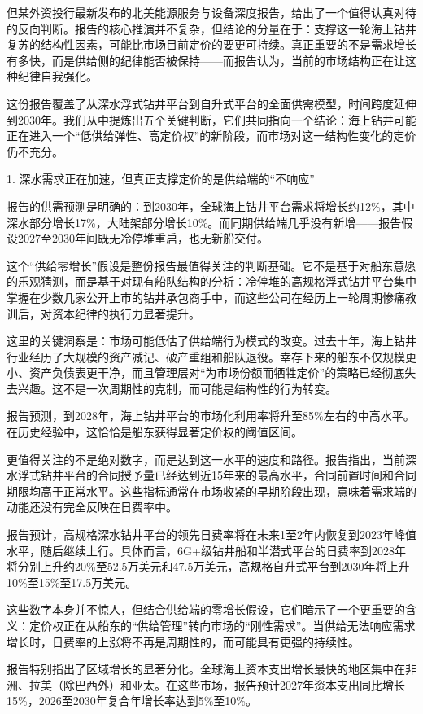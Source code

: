 \documentclass[11pt]{ctexart}
\begin{document}
但某外资投行最新发布的北美能源服务与设备深度报告，给出了一个值得认真对待的反向判断。报告的核心推演并不复杂，但结论的分量在于：支撑这一轮海上钻井复苏的结构性因素，可能比市场目前定价的要更可持续。真正重要的不是需求增长有多快，而是供给侧的纪律能否被保持——而报告认为，当前的市场结构正在让这种纪律自我强化。

这份报告覆盖了从深水浮式钻井平台到自升式平台的全面供需模型，时间跨度延伸到2030年。我们从中提炼出五个关键判断，它们共同指向一个结论：海上钻井可能正在进入一个“低供给弹性、高定价权”的新阶段，而市场对这一结构性变化的定价仍不充分。

1. 深水需求正在加速，但真正支撑定价的是供给端的“不响应”

报告的供需预测是明确的：到2030年，全球海上钻井平台需求将增长约12\%，其中深水部分增长17\%，大陆架部分增长10\%。而同期供给端几乎没有新增——报告假设2027至2030年间既无冷停堆重启，也无新船交付。

这个“供给零增长”假设是整份报告最值得关注的判断基础。它不是基于对船东意愿的乐观猜测，而是基于对现有船队结构的分析：冷停堆的高规格浮式钻井平台集中掌握在少数几家公开上市的钻井承包商手中，而这些公司在经历上一轮周期惨痛教训后，对资本纪律的执行力显著提升。

这里的关键洞察是：市场可能低估了供给端行为模式的改变。过去十年，海上钻井行业经历了大规模的资产减记、破产重组和船队退役。幸存下来的船东不仅规模更小、资产负债表更干净，而且管理层对“为市场份额而牺牲定价”的策略已经彻底失去兴趣。这不是一次周期性的克制，而可能是结构性的行为转变。

报告预测，到2028年，海上钻井平台的市场化利用率将升至85\%左右的中高水平。在历史经验中，这恰恰是船东获得显著定价权的阈值区间。

更值得关注的不是绝对数字，而是达到这一水平的速度和路径。报告指出，当前深水浮式钻井平台的合同授予量已经达到近15年来的最高水平，合同前置时间和合同期限均高于正常水平。这些指标通常在市场收紧的早期阶段出现，意味着需求端的动能还没有完全反映在日费率中。

报告预计，高规格深水钻井平台的领先日费率将在未来1至2年内恢复到2023年峰值水平，随后继续上行。具体而言，6G+级钻井船和半潜式平台的日费率到2028年将分别上升约20\%至52.5万美元和47.5万美元，高规格自升式平台到2030年将上升10\%至15\%至17.5万美元。

这些数字本身并不惊人，但结合供给端的零增长假设，它们暗示了一个更重要的含义：定价权正在从船东的“供给管理”转向市场的“刚性需求”。当供给无法响应需求增长时，日费率的上涨将不再是周期性的，而可能具有更强的持续性。

报告特别指出了区域增长的显著分化。全球海上资本支出增长最快的地区集中在非洲、拉美（除巴西外）和亚太。在这些市场，报告预计2027年资本支出同比增长15\%，2026至2030年复合年增长率达到5\%至10\%。
\end{document}
